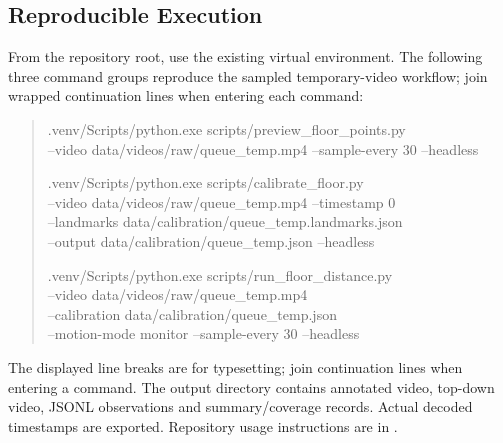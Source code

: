 \subsection{Reproducible Execution}
From the repository root, use the existing virtual environment. The following three command groups reproduce the sampled temporary-video workflow; join wrapped continuation lines when entering each command:
\begin{quote}\small\ttfamily
.venv/Scripts/python.exe scripts/preview\_floor\_points.py\\
\hspace*{1em}--video data/videos/raw/queue\_temp.mp4 --sample-every 30 --headless
\par
.venv/Scripts/python.exe scripts/calibrate\_floor.py\\
\hspace*{1em}--video data/videos/raw/queue\_temp.mp4 --timestamp 0\\
\hspace*{1em}--landmarks data/calibration/queue\_temp.landmarks.json\\
\hspace*{1em}--output data/calibration/queue\_temp.json --headless
\par
.venv/Scripts/python.exe scripts/run\_floor\_distance.py\\
\hspace*{1em}--video data/videos/raw/queue\_temp.mp4\\
\hspace*{1em}--calibration data/calibration/queue\_temp.json\\
\hspace*{1em}--motion-mode monitor --sample-every 30 --headless
\end{quote}
The displayed line breaks are for typesetting; join continuation lines when entering a command. The output directory contains annotated video, top-down video, JSONL observations and summary/coverage records. Actual decoded timestamps are exported. Repository usage instructions are in .

